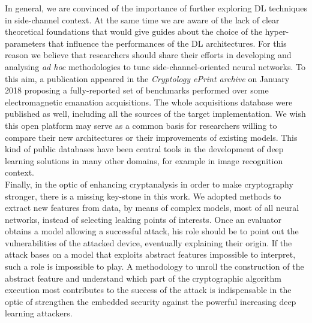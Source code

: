 In general, we are convinced of the importance of further exploring DL techniques in side-channel context. At the same time we are aware of the lack of clear theoretical foundations that would give guides about the choice of the hyper-parameters that influence the performances of the DL architectures. For this reason we believe that researchers should share their efforts in developing and analysing \textit{ad hoc} methodologies to tune side-channel-oriented neural networks. To this aim, a publication appeared in the \emph{Cryptology ePrint archive} on January 2018 \cite{eprintASCADpaper} proposing a fully-reported set of benchmarks performed over some electromagnetic emanation acquisitions. The whole acquisitions database were published as well, including all the sources of the target implementation. We wish this open platform may serve as a common basis for researchers willing to compare their new architectures or their improvements of existing models. This kind of public databases have been central tools in the development of deep learning solutions in many other domains, for example in image recognition context.\\

Finally, in the optic of enhancing cryptanalysis in order to make cryptography stronger, there is a missing key-stone in this work. We adopted methods to extract new features from data, by means of complex models, most of all neural networks, instead of selecting leaking points of interests. Once an evaluator obtains a model allowing a successful attack, his role should be to point out the vulnerabilities of the attacked device, eventually explaining their origin. If the attack bases on a model that exploits abstract features impossible to interpret, such a role is impossible to play. A methodology to unroll the construction of the abstract feature and understand which part of the cryptographic algorithm execution most contributes to the success of the attack is indispensable in the optic of strengthen the embedded security against the powerful increasing deep learning attackers.
